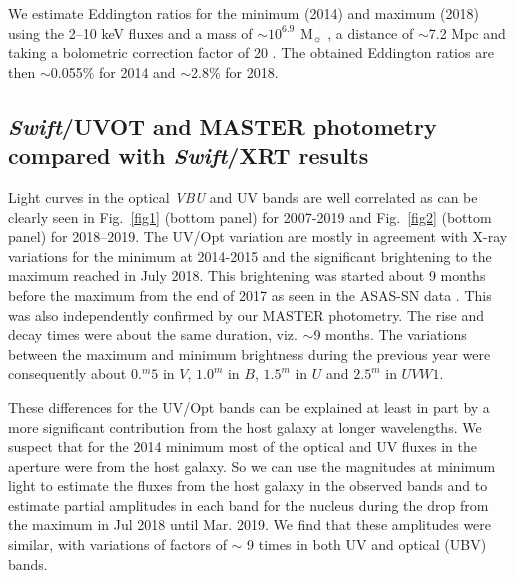 \documentclass[fleqn,usenatbib]{mnras}
\begin{document}
We estimate Eddington ratios for the minimum (2014) and maximum (2018) using the 2--10 keV fluxes and a mass of $\sim10^{6.9}$ M$_{\sun}$ \citep{Woo2002}, a distance of $\sim$7.2 Mpc and taking a bolometric correction factor of 20 \citep{Vasudevan2009}. The obtained Eddington ratios are then $\sim$0.055\% for 2014 and $\sim$2.8\% for 2018.



\subsection{{\it Swift}/UVOT and MASTER photometry compared with {\it Swift}/XRT results}

Light curves in the optical {\it VBU} and UV bands are well correlated as can be clearly seen in Fig.~\ref{fig1} (bottom panel) for 2007-2019 and Fig.~\ref{fig2} (bottom panel) for 2018--2019.
The UV/Opt variation are mostly in agreement with X-ray variations for the minimum at 2014-2015 and the significant brightening to the maximum reached in July 2018. This brightening was started about 9 months before the maximum from the end of 2017 as seen in the ASAS-SN data \citep{Dai2018, Parker2019}. This was also independently confirmed by our MASTER photometry. The rise and decay times were about the same duration, viz. $\sim$9 months.
The variations between the maximum and minimum brightness during the previous year were consequently about $0.^{m}5$ in $V$, $1.0^{m}$ in $B$, $1.5^{m}$ in $U$ and $2.5^{m}$ in $UVW1$.

These differences for the UV/Opt bands can be explained at least in part by a more significant contribution from the host galaxy at longer wavelengths. We suspect that for the 2014 minimum most of the optical and UV fluxes in the aperture were from the host galaxy. So we can use the magnitudes at minimum light to estimate the fluxes from the host galaxy in the observed bands and to estimate partial amplitudes in each band for the nucleus during the drop from the maximum in Jul 2018 until Mar. 2019. We find that these amplitudes were similar, with variations of factors of $\sim$ 9 times in both UV and optical (UBV) bands.
\end{document}
